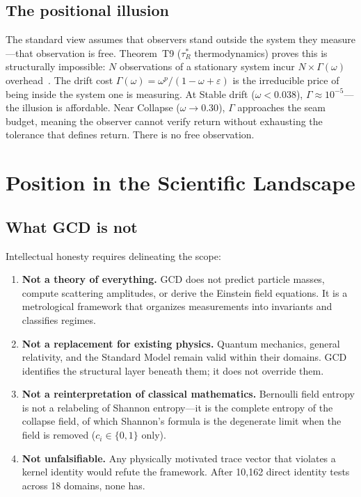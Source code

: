 \documentclass[
  aps,
  prd,
  twocolumn,
  superscriptaddress,
  nofootinbib,
  floatfix
]{revtex4-2}
\newcommand{\tRS}{\tau_{\!R}^{*}}
\newcommand{\Gam}{\Gamma}
\newcommand{\eps}{\varepsilon}
\begin{document}
\subsection{The positional illusion}

The standard view assumes that observers stand outside the system
they measure---that observation is free.  Theorem~T9 ($\tRS$
thermodynamics) proves this is structurally impossible: $N$
observations of a stationary system incur $N \times \Gam(\omega)$
overhead~\cite{paulus2025seamreality}.  The drift cost
$\Gam(\omega) = \omega^p / (1 - \omega + \eps)$ is the irreducible
price of being inside the system one is measuring.  At Stable drift
($\omega < 0.038$), $\Gam \approx 10^{-5}$---the illusion is
affordable.  Near Collapse ($\omega \to 0.30$), $\Gam$ approaches the
seam budget, meaning the observer cannot verify return without
exhausting the tolerance that defines return.  There is no free
observation.

\section{Position in the Scientific Landscape}\label{sec:landscape}

\subsection{What GCD is not}

Intellectual honesty requires delineating the scope:

\begin{enumerate}[leftmargin=*,label=(\roman*)]
\item \textbf{Not a theory of everything.}  GCD does not predict
  particle masses, compute scattering amplitudes, or derive the
  Einstein field equations.  It is a metrological framework that
  organizes measurements into invariants and classifies regimes.

\item \textbf{Not a replacement for existing physics.}  Quantum
  mechanics, general relativity, and the Standard Model remain
  valid within their domains.  GCD identifies the structural layer
  beneath them; it does not override them.

\item \textbf{Not a reinterpretation of classical mathematics.}
  Bernoulli field entropy is not a relabeling of Shannon
  entropy---it is the complete entropy of the collapse field, of
  which Shannon's formula is the degenerate limit when the field is
  removed ($c_i \in \{0,1\}$ only).

\item \textbf{Not unfalsifiable.}  Any physically motivated trace
  vector that violates a kernel identity would refute the framework.
  After 10{,}162 direct identity tests across 18 domains, none has.
\end{enumerate}
\end{document}
